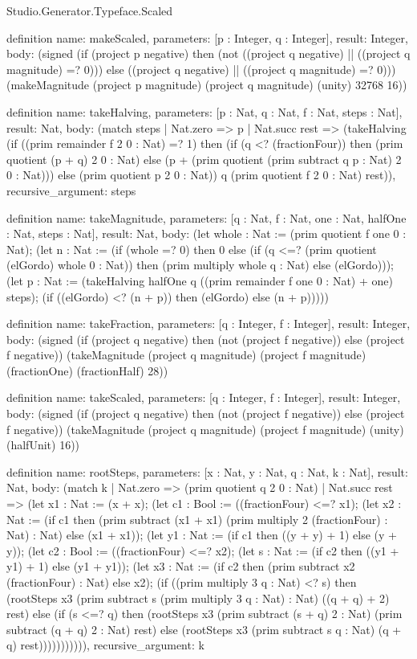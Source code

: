 \begin{lexlean}{Studio.Generator.Typeface.Scaled}
\begin{semanticmodule}
definition{
  name: makeScaled,
  parameters: [p : Integer, q : Integer],
  result: Integer,
  body: (signed (if (project p negative) then (not ((project q negative) || ((project q magnitude) =? 0))) else ((project q negative) || ((project q magnitude) =? 0))) (makeMagnitude (project p magnitude) (project q magnitude) (unity) 32768 16))
}

definition{
  name: takeHalving,
  parameters: [p : Nat, q : Nat, f : Nat, steps : Nat],
  result: Nat,
  body: (match steps
    | Nat.zero => p
    | Nat.succ rest => (takeHalving (if ((prim remainder f 2 0 : Nat) =? 1) then (if (q <? (fractionFour)) then (prim quotient (p + q) 2 0 : Nat) else (p + (prim quotient (prim subtract q p : Nat) 2 0 : Nat))) else (prim quotient p 2 0 : Nat)) q (prim quotient f 2 0 : Nat) rest)),
  recursive_argument: steps
}

definition{
  name: takeMagnitude,
  parameters: [q : Nat, f : Nat, one : Nat, halfOne : Nat, steps : Nat],
  result: Nat,
  body: (let whole : Nat := (prim quotient f one 0 : Nat); (let n : Nat := (if (whole =? 0) then 0 else (if (q <=? (prim quotient (elGordo) whole 0 : Nat)) then (prim multiply whole q : Nat) else (elGordo))); (let p : Nat := (takeHalving halfOne q ((prim remainder f one 0 : Nat) + one) steps); (if ((elGordo) <? (n + p)) then (elGordo) else (n + p)))))
}

definition{
  name: takeFraction,
  parameters: [q : Integer, f : Integer],
  result: Integer,
  body: (signed (if (project q negative) then (not (project f negative)) else (project f negative)) (takeMagnitude (project q magnitude) (project f magnitude) (fractionOne) (fractionHalf) 28))
}

definition{
  name: takeScaled,
  parameters: [q : Integer, f : Integer],
  result: Integer,
  body: (signed (if (project q negative) then (not (project f negative)) else (project f negative)) (takeMagnitude (project q magnitude) (project f magnitude) (unity) (halfUnit) 16))
}

definition{
  name: rootSteps,
  parameters: [x : Nat, y : Nat, q : Nat, k : Nat],
  result: Nat,
  body: (match k
    | Nat.zero => (prim quotient q 2 0 : Nat)
    | Nat.succ rest => (let x1 : Nat := (x + x); (let c1 : Bool := ((fractionFour) <=? x1); (let x2 : Nat := (if c1 then (prim subtract (x1 + x1) (prim multiply 2 (fractionFour) : Nat) : Nat) else (x1 + x1)); (let y1 : Nat := (if c1 then ((y + y) + 1) else (y + y)); (let c2 : Bool := ((fractionFour) <=? x2); (let s : Nat := (if c2 then ((y1 + y1) + 1) else (y1 + y1)); (let x3 : Nat := (if c2 then (prim subtract x2 (fractionFour) : Nat) else x2); (if ((prim multiply 3 q : Nat) <? s) then (rootSteps x3 (prim subtract s (prim multiply 3 q : Nat) : Nat) ((q + q) + 2) rest) else (if (s <=? q) then (rootSteps x3 (prim subtract (s + q) 2 : Nat) (prim subtract (q + q) 2 : Nat) rest) else (rootSteps x3 (prim subtract s q : Nat) (q + q) rest))))))))))),
  recursive_argument: k
}


\end{semanticmodule}
\end{lexlean}
